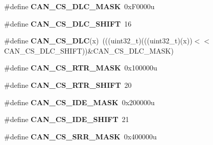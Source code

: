 \begin{DoxyCompactItemize}
\item 
\#define {\bfseries C\+A\+N\+\_\+\+C\+S\+\_\+\+D\+L\+C\+\_\+\+M\+A\+SK}~0x\+F0000u\hypertarget{group__CAN__Register__Masks_ga968a36f7478c9fad396ac64b5f1f18a2}{}\label{group__CAN__Register__Masks_ga968a36f7478c9fad396ac64b5f1f18a2}

\item 
\#define {\bfseries C\+A\+N\+\_\+\+C\+S\+\_\+\+D\+L\+C\+\_\+\+S\+H\+I\+FT}~16\hypertarget{group__CAN__Register__Masks_ga4e110f941e1580ad04b71b8ee68605ce}{}\label{group__CAN__Register__Masks_ga4e110f941e1580ad04b71b8ee68605ce}

\item 
\#define {\bfseries C\+A\+N\+\_\+\+C\+S\+\_\+\+D\+LC}(x)~(((uint32\+\_\+t)(((uint32\+\_\+t)(x))$<$$<$C\+A\+N\+\_\+\+C\+S\+\_\+\+D\+L\+C\+\_\+\+S\+H\+I\+FT))\&C\+A\+N\+\_\+\+C\+S\+\_\+\+D\+L\+C\+\_\+\+M\+A\+SK)\hypertarget{group__CAN__Register__Masks_ga5c0c74dd9d5bddf256e4badb7ba3d9c6}{}\label{group__CAN__Register__Masks_ga5c0c74dd9d5bddf256e4badb7ba3d9c6}

\item 
\#define {\bfseries C\+A\+N\+\_\+\+C\+S\+\_\+\+R\+T\+R\+\_\+\+M\+A\+SK}~0x100000u\hypertarget{group__CAN__Register__Masks_ga64cd76de04f63c4e897feab93243a4d1}{}\label{group__CAN__Register__Masks_ga64cd76de04f63c4e897feab93243a4d1}

\item 
\#define {\bfseries C\+A\+N\+\_\+\+C\+S\+\_\+\+R\+T\+R\+\_\+\+S\+H\+I\+FT}~20\hypertarget{group__CAN__Register__Masks_ga3298f7864757605895c4495c51d4f675}{}\label{group__CAN__Register__Masks_ga3298f7864757605895c4495c51d4f675}

\item 
\#define {\bfseries C\+A\+N\+\_\+\+C\+S\+\_\+\+I\+D\+E\+\_\+\+M\+A\+SK}~0x200000u\hypertarget{group__CAN__Register__Masks_ga8195b85087fd378777c67830ac2ca9fb}{}\label{group__CAN__Register__Masks_ga8195b85087fd378777c67830ac2ca9fb}

\item 
\#define {\bfseries C\+A\+N\+\_\+\+C\+S\+\_\+\+I\+D\+E\+\_\+\+S\+H\+I\+FT}~21\hypertarget{group__CAN__Register__Masks_gae432768b4222f18cc1cec2b71ea8c579}{}\label{group__CAN__Register__Masks_gae432768b4222f18cc1cec2b71ea8c579}

\item 
\#define {\bfseries C\+A\+N\+\_\+\+C\+S\+\_\+\+S\+R\+R\+\_\+\+M\+A\+SK}~0x400000u\hypertarget{group__CAN__Register__Masks_gafd71067968d03b95e1dae32dc18ac578}{}\label{group__CAN__Register__Masks_gafd71067968d03b95e1dae32dc18ac578}


\end{DoxyCompactItemize}
